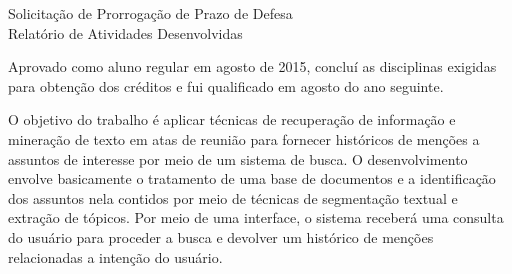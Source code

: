 	\thispagestyle{empty}
	\singlespacing

	\noindent

	\vi
	\vi
	\vi

	\begin{center}
		\Large Solicitação de Prorrogação de Prazo de Defesa\\
		\vi
		\large Relatório de Atividades Desenvolvidas

	\end{center}
	\vi
	
	

\newcommand{\urlatas}{http://www.ppgccs.net/?page\_id=1150}

\newcommand{\urleniac}{http://www.bracis2017.ufu.br/eniac-encontro-nacional-de-inteligencia-artificial-e-computacional\#tab-0-0}

Aprovado como aluno regular em agosto de 2015, concluí as disciplinas exigidas para obtenção dos créditos e fui qualificado em agosto do ano seguinte. 

O objetivo do trabalho é aplicar técnicas de recuperação de informação e mineração de texto em atas de reunião para fornecer históricos de menções a assuntos de interesse por meio de um sistema de busca. O desenvolvimento envolve basicamente 
o tratamento de uma base de documentos e a identificação dos assuntos nela contidos por meio de técnicas de segmentação textual e extração de tópicos. Por meio de uma interface, o sistema receberá uma consulta do usuário para proceder a busca e devolver um histórico de menções relacionadas a intenção do usuário.


